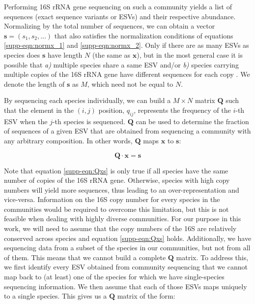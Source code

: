 \documentclass[a4paper,10pt]{article}
\begin{document}
Performing 16S rRNA gene sequencing on such a community yields a list of
sequences (exact sequence variants or ESVs) and their respective abundance.
Normalizing by the total number of sequences, we can obtain a vector $\mathbf{s}
= \left( s_1, s_2, \dotsc \right)$ that also satisfies the normalization
conditions of equations \ref{supp-eqn:normx_1} and \ref{supp-eqn:normx_2}.
Only if there are as many ESVs as species does $\mathbf{s}$ have length $N$
(the same as $\mathbf{x}$), but in the most general case it is possible that
\textit{a)} multiple species share a same ESV and/or \textit{b)} species carrying
multiple copies
of the 16S rRNA gene have different sequences for each copy \cite{Vetrovsky2013}. We denote
the length of $\mathbf{s}$ as $M$, which need not be equal to $N$.

By sequencing each species individually, we can build a $M \times N$ 
matrix $\mathbf{Q}$ such
that the element in the $(i,j)$ position, $q_{ij}$, represents the frequency of
the $i$-th ESV when the $j$-th species is sequenced. $\mathbf{Q}$ can be used
to determine the fraction of sequences of a given ESV that are obtained from
sequencing a community with any arbitrary composition. In other words,
$\mathbf{Q}$ maps $\mathbf{x}$ to $\mathbf{s}$:

\begin{equation}
\mathbf{Q} \cdot \mathbf{x} = \mathbf{s}
\label{supp-eqn:Qxs}
\end{equation}

Note that equation \ref{supp-eqn:Qxs} is only true if all species have the same
number of copies of the 16S rRNA gene. Otherwise, species with high copy numbers
will yield more sequences, thus leading to an over-representation and vice-versa.
Information on the 16S copy number for every species in the communities would be
required to overcome this limitation, but this is not feasible when dealing with
highly diverse communities. For our purpose in this
work, we will need to assume that the copy numbers of the 16S are relatively
conserved across species and equation \ref{supp-eqn:Qxs} holds. Additionally,
we have sequencing data from a subset of the species in our
communities, but not from all of them. This means that we cannot build a complete
$\mathbf{Q}$ matrix. To address this, we first identify every ESV obtained
from community sequencing that we cannot map back to (at least) one of the
species for which we have single-species sequencing information. We then
assume that each
of those ESVs maps uniquely to a single species. This gives us a $\mathbf{Q}$
matrix of the form:
\end{document}
